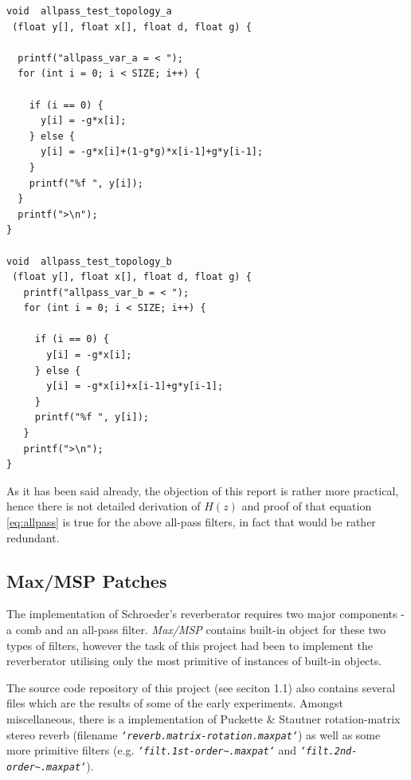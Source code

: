 \documentclass[12pt]{report}
\begin{document}
\begin{lstlisting}
void  allpass_test_topology_a
 (float y[], float x[], float d, float g) {

  printf("allpass_var_a = < ");
  for (int i = 0; i < SIZE; i++) {
  
    if (i == 0) { 
      y[i] = -g*x[i];
    } else {
      y[i] = -g*x[i]+(1-g*g)*x[i-1]+g*y[i-1];
    }
    printf("%f ", y[i]);
  }
  printf(">\n");
}

void  allpass_test_topology_b
 (float y[], float x[], float d, float g) {
   printf("allpass_var_b = < ");
   for (int i = 0; i < SIZE; i++) {

     if (i == 0) { 
       y[i] = -g*x[i];
     } else {
       y[i] = -g*x[i]+x[i-1]+g*y[i-1];
     }
     printf("%f ", y[i]);
   }
   printf(">\n");
}
\end{lstlisting}
\vspace{2em}
As it has been said already, the objection of this report is rather more
practical, hence there is not detailed derivation of $H(z)$ and proof of
that equation \ref{eq:allpass} is true for the above all-pass filters,
in fact that would be rather redundant.

\subsection{Max/MSP Patches}

The implementation of Schroeder's reverberator requires two major components -
a comb and an all-pass filter. \emph{Max/MSP} contains built-in object for
these two types of filters, however the task of this project had been to
implement the reverberator utilising only the most primitive of instances of
built-in objects.

The source code repository of this project (see seciton 1.1) also contains
several files which are the results of some of the early experiments.
Amongst miscellaneous, there is a implementation of Puckette \& Stautner
rotation-matrix stereo reverb (filename \emph{\texttt{`reverb.matrix-rotation.maxpat`}})
as well as some more primitive filters (e.g. \emph{\texttt{`filt.1st-order\~{}.maxpat`}}
and \emph{\texttt{`filt.2nd-order\~{}.maxpat`}}).
\end{document}

